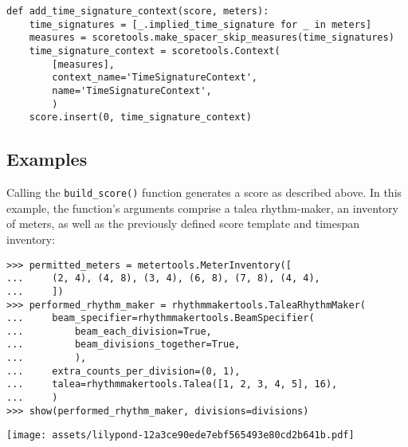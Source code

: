 \begin{singlespacing}
\vspace{-0.5\baselineskip}
\begin{lstlisting}
def add_time_signature_context(score, meters):
    time_signatures = [_.implied_time_signature for _ in meters]
    measures = scoretools.make_spacer_skip_measures(time_signatures)
    time_signature_context = scoretools.Context(
        [measures],
        context_name='TimeSignatureContext',
        name='TimeSignatureContext',
        )
    score.insert(0, time_signature_context)
\end{lstlisting}
\end{singlespacing}

\subsection{Examples}

\noindent Calling the \texttt{build\_score()} function generates a score as
described above. In this example, the function's arguments comprise a talea
rhythm-maker, an inventory of meters, as well as the previously defined score
template and timespan inventory:

\begin{comment}
<abjad>
permitted_meters = metertools.MeterInventory([
    (2, 4), (4, 8), (3, 4), (6, 8), (7, 8), (4, 4),
    ])
performed_rhythm_maker = rhythmmakertools.TaleaRhythmMaker(
    beam_specifier=rhythmmakertools.BeamSpecifier(
        beam_each_division=True,
        beam_divisions_together=True,
        ),
    extra_counts_per_division=(0, 1),
    talea=rhythmmakertools.Talea([1, 2, 3, 4, 5], 16),
    )
show(performed_rhythm_maker, divisions=divisions)
</abjad>
\end{comment}

\begin{singlespacing}
\vspace{-0.5\baselineskip}
\begin{lstlisting}
>>> permitted_meters = metertools.MeterInventory([
...     (2, 4), (4, 8), (3, 4), (6, 8), (7, 8), (4, 4),
...     ])
>>> performed_rhythm_maker = rhythmmakertools.TaleaRhythmMaker(
...     beam_specifier=rhythmmakertools.BeamSpecifier(
...         beam_each_division=True,
...         beam_divisions_together=True,
...         ),
...     extra_counts_per_division=(0, 1),
...     talea=rhythmmakertools.Talea([1, 2, 3, 4, 5], 16),
...     )
>>> show(performed_rhythm_maker, divisions=divisions)
\end{lstlisting}
\noindent\texttt{[image: assets/lilypond-12a3ce90ede7ebf565493e80cd2b641b.pdf]}
\end{singlespacing}

